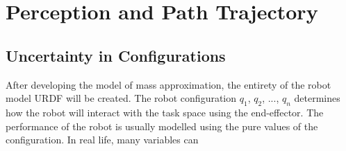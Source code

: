 \section{Perception and Path Trajectory}
\subsection{Uncertainty in Configurations}
After developing the model of mass approximation, the entirety of the robot model URDF will be created. The robot configuration $q_1$, $q_2$, ..., $q_n$ determines how the robot will interact with the task space using the end-effector.  The performance of the robot is usually modelled using the pure values of the configuration.  In real life, many variables can 
